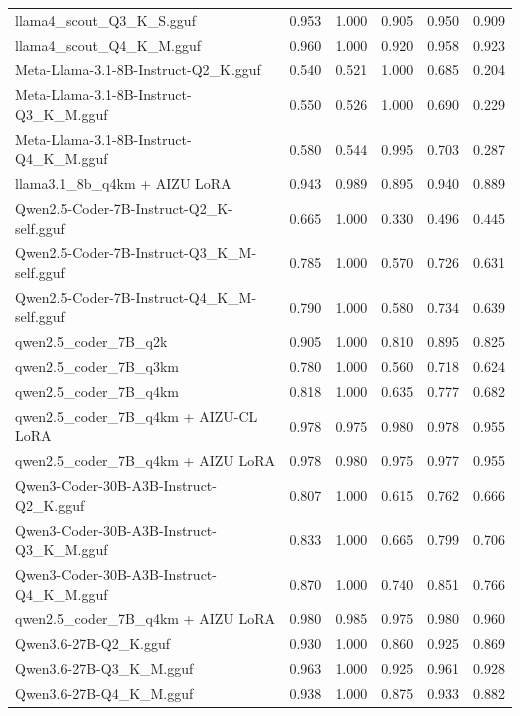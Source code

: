 \begin{table}[htbp]
{\begin{tabular}{lrrrrr}
    llama4\_scout\_Q3\_K\_S.gguf & 0.953 & 1.000 & 0.905 & 0.950 & 0.909 \\
    llama4\_scout\_Q4\_K\_M.gguf & 0.960 & 1.000 & 0.920 & 0.958 & 0.923 \\
    Meta-Llama-3.1-8B-Instruct-Q2\_K.gguf & 0.540 & 0.521 & 1.000 & 0.685 & 0.204 \\
    Meta-Llama-3.1-8B-Instruct-Q3\_K\_M.gguf & 0.550 & 0.526 & 1.000 & 0.690 & 0.229 \\
    Meta-Llama-3.1-8B-Instruct-Q4\_K\_M.gguf & 0.580 & 0.544 & 0.995 & 0.703 & 0.287 \\
    llama3.1\_8b\_q4km + AIZU LoRA & 0.943 & 0.989 & 0.895 & 0.940 & 0.889 \\
    Qwen2.5-Coder-7B-Instruct-Q2\_K-self.gguf & 0.665 & 1.000 & 0.330 & 0.496 & 0.445 \\
    Qwen2.5-Coder-7B-Instruct-Q3\_K\_M-self.gguf & 0.785 & 1.000 & 0.570 & 0.726 & 0.631 \\
    Qwen2.5-Coder-7B-Instruct-Q4\_K\_M-self.gguf & 0.790 & 1.000 & 0.580 & 0.734 & 0.639 \\
    qwen2.5\_coder\_7B\_q2k & 0.905 & 1.000 & 0.810 & 0.895 & 0.825 \\
    qwen2.5\_coder\_7B\_q3km & 0.780 & 1.000 & 0.560 & 0.718 & 0.624 \\
    qwen2.5\_coder\_7B\_q4km & 0.818 & 1.000 & 0.635 & 0.777 & 0.682 \\
    qwen2.5\_coder\_7B\_q4km + AIZU-CL LoRA & 0.978 & 0.975 & 0.980 & 0.978 & \cellcolor{green!40}0.955 \\
    qwen2.5\_coder\_7B\_q4km + AIZU LoRA & 0.978 & 0.980 & 0.975 & 0.977 & \cellcolor{green!30}0.955 \\
    Qwen3-Coder-30B-A3B-Instruct-Q2\_K.gguf & 0.807 & 1.000 & 0.615 & 0.762 & 0.666 \\
    Qwen3-Coder-30B-A3B-Instruct-Q3\_K\_M.gguf & 0.833 & 1.000 & 0.665 & 0.799 & 0.706 \\
    Qwen3-Coder-30B-A3B-Instruct-Q4\_K\_M.gguf & 0.870 & 1.000 & 0.740 & 0.851 & 0.766 \\
    qwen2.5\_coder\_7B\_q4km + AIZU LoRA & 0.980 & 0.985 & 0.975 & 0.980 & \cellcolor{green!50}0.960 \\
    Qwen3.6-27B-Q2\_K.gguf & 0.930 & 1.000 & 0.860 & 0.925 & 0.869 \\
    Qwen3.6-27B-Q3\_K\_M.gguf & 0.963 & 1.000 & 0.925 & 0.961 & \cellcolor{green!10}0.928 \\
    Qwen3.6-27B-Q4\_K\_M.gguf & 0.938 & 1.000 & 0.875 & 0.933 & 0.882 \\

\end{tabular}}
\end{table}
